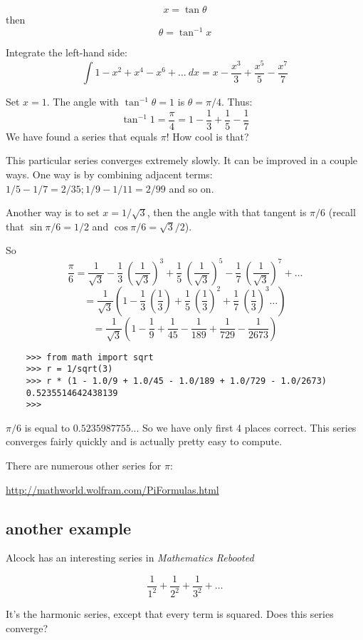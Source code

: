 \documentclass[11pt, oneside]{article}
\begin{document}
\[ x = \tan \theta \]
then
\[ \theta = \tan^{-1} x \]

Integrate the left-hand side:
\[    \int 1 - x^2 + x^4 - x^6 + \dots \ dx = x - \frac{x^3}{3} + \frac{x^5}{5} - \frac{x^7}{7} \]

Set $x = 1$.  The angle with $\tan^{-1} \theta = 1$ is $\theta = \pi/4$.  Thus:
\[    \tan^{-1} 1 = \frac{\pi}{4} = 1 - \frac{1}{3} + \frac{1}{5} - \frac{1}{7} \]
We have found a series that equals $\pi$!  How cool is that?

This particular series converges extremely slowly.  It can be improved in a couple ways.  One way is by combining adjacent terms:  $1/5 - 1/7 = 2/35;  1/9 - 1/11 = 2/99$ and so on.

Another way is to set $x = 1/\sqrt{3}$, then the angle with that tangent is $\pi/6$ (recall that $\sin \pi/6 = 1/2$ and $\cos \pi/6 = \sqrt{3}/2$).

So
\[    \frac{\pi}{6} = \frac{1}{\sqrt{3}} - \frac{1}{3} \ (\frac{1}{\sqrt{3}})^3 +  \frac{1}{5} \ (\frac{1}{\sqrt{3}})^5 -  \frac{1}{7} \ (\frac{1}{\sqrt{3}})^7 + \dots \]
\[     = \frac{1}{\sqrt{3}} (1 - \frac{1}{3} \ (\frac{1}{3}) + \frac{1}{5} \ (\frac{1}{3})^2 + \frac{1}{7} \ (\frac{1}{3})^3 \dots) \]
\[    = \frac{1}{\sqrt{3}} (1 - \frac{1}{9} + \frac{1}{45} - \frac{1}{189} + \frac{1}{729} - \frac{1}{2673}) \]

\begin{verbatim}
    >>> from math import sqrt
    >>> r = 1/sqrt(3)
    >>> r * (1 - 1.0/9 + 1.0/45 - 1.0/189 + 1.0/729 - 1.0/2673)
    0.5235514642438139
    >>>
\end{verbatim}

$\pi/6$ is equal to $0.5235987755..$.  So we have only first 4 places correct.  This series converges fairly quickly and is actually pretty easy to compute.

There are numerous other series for $\pi$:

\url{http://mathworld.wolfram.com/PiFormulas.html}

\subsection*{another example}

Alcock has an interesting series in \emph{Mathematics Rebooted}

\[ \frac{1}{1^2} + \frac{1}{2^2} + \frac{1}{3^2} + \dots \]

It's the harmonic series, except that every term is squared.  Does this series converge?
\end{document}

